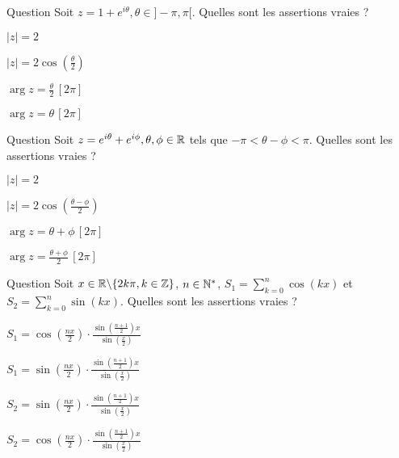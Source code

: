 \begin{multi}[multiple,feedback=
{\(z=e^{i\frac{\theta}{2}} (e^{i\frac{\theta}{2}} + e^{-i\frac{\theta}{2}}) = 2 \cos (\frac{\theta}{2}) e^{i\frac{\theta}{2}}\). Comme \(\theta \in ]-\pi,\pi[\) ,  \(\cos (\frac{\theta}{2})>0\). On déduit que : \(|z|=2\cos (\frac{\theta}{2})\) et \(\arg z =  \frac{\theta}{2} \, [2\pi]\).
}]{Question}
Soit \(z=1+ e^{i\theta},\theta \in ]-\pi,\pi[\). Quelles sont les assertions vraies ?

    \item \(|z|=2 \)
    \item* \(|z|=2\cos(\frac{\theta}{2}) \)
    \item* \(\arg z =  \frac{\theta}{2} \, [2\pi]\)
    \item \(\arg z = \theta \, [2\pi]\)
\end{multi}


\begin{multi}[multiple,feedback=
{\( z=e^{i\frac{\theta+\phi}{2}} (e^{i\frac{\theta-\phi}{2}} + e^{i\frac{\phi - \theta}{2}}) = 2 \cos (\frac{\theta-\phi}{2}) e^{i\frac{\theta+\phi}{2}}\). Comme \(\theta-\phi \in ]-\pi,\pi[\),   \(\cos (\frac{\theta-\phi}{2})>0\). On déduit que : \(|z|=2\cos (\frac{\theta-\phi}{2})\) et \(\arg z =  \frac{\theta+\phi}{2} \, [2\pi]\).
}]{Question}
Soit \(z=e^{i\theta} + e^{i\phi} ,\theta, \phi \in \mathbb{R}\) tels que \(-\pi < \theta - \phi < \pi\). Quelles sont les assertions vraies ?

    \item \(|z|=2 \)
    \item* \(|z|=2\cos (\frac{ \theta -\phi}{2}) \)
    \item \(\arg z = \theta +\phi  \, [2\pi]\)
    \item* \(\arg z = \frac{\theta+ \phi}{2} \, [2\pi]\)
\end{multi}


\begin{multi}[multiple,feedback=
{On calcule la somme géométrique \(\sum_{k=0}^{n} e^{ikx}= \sum_{k=0}^{n} (e^{ix})^k = \frac{1-e^{i(n+1)x}}{1-e^{ix}}=\frac{e^{i\frac{(n+1)x}{2}}(e^{-i\frac{(n+1)x}{2}}-e^{i\frac{(n+1)x}{2}})}{e^{i\frac{x}{2}}(e^{-i\frac{x}{2}}-e^{i\frac{x}{2}})}= e^{i\frac{nx}{2}}\cdot  \frac{\sin (\frac{n+1}{2})x}{\sin (\frac{x}{2})}\); puis, la partie réelle
et imaginaire de cette somme.
}]{Question}
Soit \(x\in \mathbb{R}\backslash \{2k\pi, k \in \mathbb{Z}\}\), \(n \in \mathbb{N}^*\), 
\(S_1= \sum_{k=0}^{n} \cos(kx)\) et \(S_2= \sum_{k=0}^{n} \sin(kx)\). Quelles sont les assertions vraies ?

    \item* \(S_1= \cos (\frac{nx}{2})\cdot  \frac{\sin (\frac{n+1}{2})x}{\sin (\frac{x}{2})}\)
    \item \(S_1= \sin (\frac{nx}{2}) \cdot  \frac{\sin (\frac{n+1}{2})x}{\sin (\frac{x}{2})}\)
    \item* \(S_2=\sin (\frac{nx}{2}) \cdot  \frac{\sin (\frac{n+1}{2})x}{\sin (\frac{x}{2})}\)
    \item \(S_2= \cos (\frac{nx}{2}) \cdot  \frac{\sin (\frac{n+1}{2})x}{\sin (\frac{x}{2})}\)
\end{multi}


